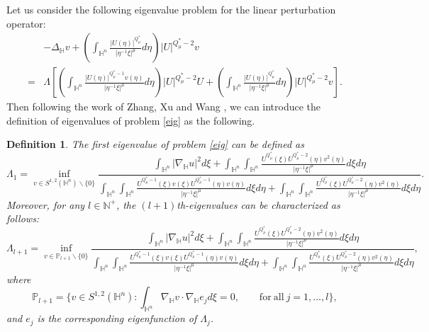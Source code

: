 \documentclass[11pt]{article}
\newtheorem{definition}{Definition}[section]
\begin{document}
Let us consider the following eigenvalue problem for the linear perturbation operator:
\begin{align}\label{eig}
	&-\Delta_{\mathbb{H}} v+\left(\int_{\mathbb{H}^{n}}\frac{|U(\eta)|^{Q^{\ast}_{\mu}}}{|\eta^{-1}\xi|^{\mu}}{d}\eta\right)
|U|^{Q^{\ast}_{\mu}-2}v \nonumber\\
=&\Lambda\left[\left(\int_{\mathbb{H}^{n}}\frac{|U(\eta)|^{Q^{\ast}_{\mu}-1}v(\eta)}
{|\eta^{-1}\xi|^{\mu}}{d}\eta\right)|U|^{Q^{\ast}_{\mu}-2}U+
\left(\int_{\mathbb{H}^{n}}\frac{|U(\eta)|^{Q^{\ast}_{\mu}}}{|\eta^{-1}\xi|^{\mu}}{d}\eta\right)
|U|^{Q^{\ast}_{\mu}-2}v\right].
\end{align}
Then
following the work of Zhang, Xu and Wang \cite{ZXW25}, we can introduce the definition of eigenvalues of problem \eqref{eig} as the following.
\begin{definition}\label{defi}
{\rm The first eigenvalue of problem \eqref{eig} can be defined as
\begin{equation*}
  \Lambda_1=\inf \limits_{v\in S^{1,2}(\mathbb{H}^{n}) \backslash \{0\}}\frac{ \int_{\mathbb{H}^{n}}|\nabla_{\mathbb{H}} u|^{2}{d}\xi+ \int_{\mathbb{H}^{n}}\int_{\mathbb{H}^{n}}\frac{U^{Q^{\ast}_{\mu}}(\xi)U
^{Q^{\ast}_{\mu}-2}(\eta)v^2(\eta)}{|\eta^{-1}\xi|^{\mu}}{d}\xi{d}\eta}{ \int_{\mathbb{H}^{n}}\int_{\mathbb{H}^{n}}\frac{U^{Q^{\ast}_{\mu}-1}(\xi)v(\xi)U
^{Q^{\ast}_{\mu}-1}(\eta)v(\eta)}{|\eta^{-1}\xi|^{\mu}}{d}\xi{d}\eta+ \int_{\mathbb{H}^{n}}\int_{\mathbb{H}^{n}}\frac{U^{Q^{\ast}_{\mu}}(\xi)U
^{Q^{\ast}_{\mu}-2}(\eta)v^2(\eta)}{|\eta^{-1}\xi|^{\mu}}{d}\xi{d}\eta}.
\end{equation*}
Moreover, for any $l\in \mathbb{N}^+$, the $(l+1)$th-eigenvalues can be characterized as follows:
 \begin{equation*}
  \Lambda_{l+1}=\inf \limits_{v\in \mathbb{P}_{l+1} \backslash \{0\}}\frac{ \int_{\mathbb{H}^{n}}|\nabla_{\mathbb{H}} u|^{2}{d}\xi+ \int_{\mathbb{H}^{n}}\int_{\mathbb{H}^{n}}\frac{U^{Q^{\ast}_{\mu}}(\xi)U
^{Q^{\ast}_{\mu}-2}(\eta)v^2(\eta)}{|\eta^{-1}\xi|^{\mu}}{d}\xi{d}\eta}{ \int_{\mathbb{H}^{n}}\int_{\mathbb{H}^{n}}\frac{U^{Q^{\ast}_{\mu}-1}(\xi)v(\xi)U
^{Q^{\ast}_{\mu}-1}(\eta)v(\eta)}{|\eta^{-1}\xi|^{\mu}}{d}\xi{d}\eta+ \int_{\mathbb{H}^{n}}\int_{\mathbb{H}^{n}}\frac{U^{Q^{\ast}_{\mu}}(\xi)U
^{Q^{\ast}_{\mu}-2}(\eta)v^2(\eta)}{|\eta^{-1}\xi|^{\mu}}{d}\xi{d}\eta},
\end{equation*}
where
\begin{equation*}
  \mathbb{P}_{l+1}=\bigg\{v\in S^{1,2}(\mathbb{H}^{n}): \int_{\mathbb{H}^{n}}\nabla_{\mathbb{H}}v\cdot\nabla_{\mathbb{H}}e_j{d}\xi=0,\qquad \mathrm{for ~ all}~ j=1,\ldots,l\bigg\},
\end{equation*}
and $e_j$ is the corresponding eigenfunction of $\Lambda_j$.
}
\end{definition}
\end{document}
